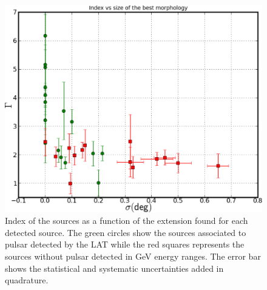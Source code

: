 \begin{figure}[h!]
\centering
\includegraphics[width=\textwidth]{figures/index_vs_size.eps}
\caption{Index of the sources as a function of the extension found for each detected source. The green circles show the sources associated to pulsar detected by the LAT while the red squares represents the sources without pulsar detected in GeV energy ranges. The error bar shows the statistical and systematic uncertainties added in quadrature. 
\label{fig:indexvssize}}
\end{figure}



